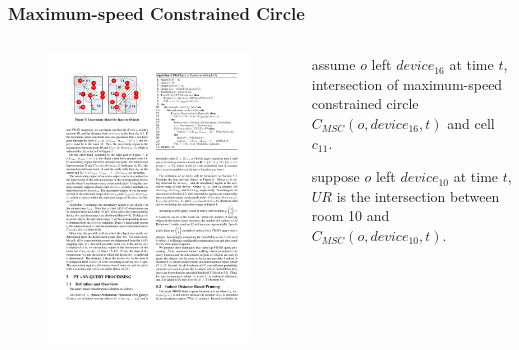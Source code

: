 \begin{frame}
\frametitle{Maximum-speed Constrained Circle}

\begin{columns}[c]

    \begin{figure}[tb]
      \includegraphics[width=\columnwidth,right]{figures/2-3/2-3-6.pdf}
    \end{figure}

  \begin{fitemize}
      \item assume ${o}$ left ${device_{16}}$ at time ${t}$, intersection of maximum-speed constrained circle ${C_{MSC}(o, device_{16}, t)}$ and cell ${c_{11}}$.
      \item suppose ${o}$ left ${device_{10}}$ at time ${t}$, ${UR}$ is the intersection between room 10 and ${C_{MSC}(o, device_{10}, t)}$.
    \end{fitemize}


\end{columns}
\end{frame}
